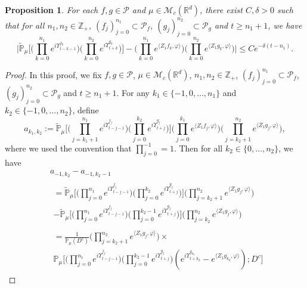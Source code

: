\documentclass[12pt,a4paper]{amsart}
\theoremstyle{plain}
\newtheorem{prop}[thm]{Proposition}
\theoremstyle{definition}
\numberwithin{equation}{section}
\begin{document}
\begin{prop}
  \label{cor:MI}
For each  $f,g\in \mathcal P$ and $\mu\in \mathcal M_c(\mathbb R^d)$, there exist $C,\delta>0$ such that for
all $n_1,n_2 \in \mathbb Z_+$, $(f_j)_{j=0}^{n_1}\subset \mathcal P_f$, $(g_j)_{j=0}^{n_2}\subset \mathcal P_g$ and $t\geq n_1+1$, we have
\begin{equation}
  \label{32corollary}
  \Big|\mathbb{\widetilde{P}}_{\mu}\Big[  \Big(\prod_{k=0}^{n_1}e^{i \Upsilon^{f_k}_{t-k-1}}\Big)  \Big( \prod_{k=0}^{n_2}e^{i \Upsilon^{g_k}_{t+k} } \Big) \Big]  -  \Big(\prod_{k=0}^{n_1} e^{\langle Z_1f_k, \varphi\rangle}\Big) \Big(\prod_{k=0}^{n_2} e^{\langle Z_1g_k, \varphi\rangle}\Big) \Big|\leq C e^{-\delta (t-n_1)}.
\end{equation}
\end{prop}
\begin{proof}
	In this proof, we fix $f,g\in \mathcal P$, $\mu\in \mathcal M_c(\mathbb R^d)$, $n_1,n_2 \in \mathbb Z_+$, $(f_j)_{j=0}^{n_1}\subset \mathcal P_f$, $(g_j)_{j=0}^{n_2}\subset \mathcal P_g$ and $t\geq n_1 + 1$.
 For any $k_1 \in \{-1,0,\dots,n_1\}$ and $k_2 \in \{-1,0,\dots,n_2\}$,  define
  \[
    a_{k_1,k_2}
    :=  \mathbb{\widetilde{P}}_{\mu}\Big[ \Big(\prod_{j=k_1+1}^{n_1} e^{i\Upsilon_{t-j-1}^{f_j}} \Big)  \Big(\prod_{j=0}^{k_2}e^{i\Upsilon_{t+j}^{g_j}}\Big) \Big] \Big(\prod_{j=0}^{k_1}e^{\langle Z_1 f_j, \varphi\rangle}\Big) \Big(\prod_{j=k_2+1}^{n_2} e^{ \langle Z_1g_j,\varphi \rangle} \Big),
  \]
where we used the convention that
$\prod_{j=0}^{-1} =1.$
  Then for all  $k_2 \in \{0,\dots,n_2\}$, we have
\begin{align}
&a_{-1,k_2} - a_{-1,k_2-1}
\\& \begin{multlined}
	=\mathbb{\widetilde{P}}_{\mu}\Big[ \Big(\prod_{j=0}^{n_1} e^{i\Upsilon_{t-j-1}^{f_j}} \Big)  \Big(\prod_{j=0}^{k_2}e^{i\Upsilon_{t+j}^{g_j}}\Big) \Big] \Big(\prod_{j=k_2+1}^{n_2} e^{ \langle Z_1g_j,\varphi \rangle} \Big)
	\\- \mathbb{\widetilde{P}}_{\mu}\Big[ \Big(\prod_{j=0}^{n_1} e^{i\Upsilon_{t-j-1}^{f_j}} \Big)  \Big(\prod_{j=0}^{k_2 - 1}e^{i\Upsilon_{t+j}^{g_j}}\Big) \Big] \Big(\prod_{j=k_2}^{n_2} e^{ \langle Z_1g_j,\varphi \rangle} \Big)
\end{multlined}
	\\& \begin{multlined}
	= \frac{1}{\mathbb{P}_{\mu}(D^c)} \Big(\prod_{j=k_2+1}^{ n_2} e^{\langle Z_1g_j, \varphi\rangle}\Big) \times {}
	\\ \mathbb{P}_{\mu}\Big[\Big(\prod_{j=0}^{n_1}e^{i\Upsilon_{t-j-1}^{f_j}}\Big) \Big(\prod_{j=0}^{k_2-1} e^{i\Upsilon_{t+j}^{g_j}}\Big) (e^{i\Upsilon^{g_{k_2}}_{t+k_2}}-e^{\langle Z_1g_{k_2}, \varphi\rangle});D^c\Big]

\end{multlined}
\end{align}
\end{proof}
\end{document}
